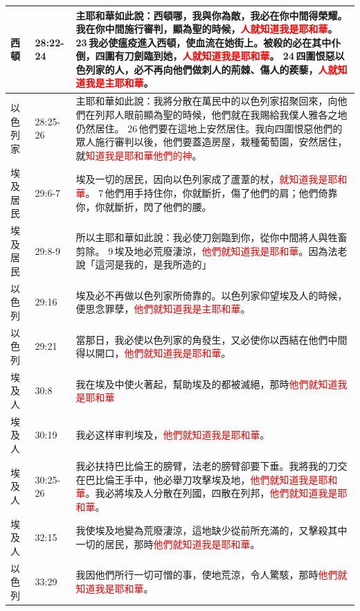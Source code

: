\begin{table}[H]
\begin{tabular}{p{1.5cm}|p{}|p{13.0cm}}
西頓&28:22-24&主耶和華如此說：西頓哪，我與你為敵，我必在你中間得榮耀。我在你中間施行審判，顯為聖的時候，\textcolor{red}{人就知道我是耶和華}。 23 我必使瘟疫進入西頓，使血流在她街上。被殺的必在其中仆倒，四圍有刀劍臨到她，\textcolor{red}{人就知道我是耶和華}。 24 四圍恨惡以色列家的人，必不再向他們做刺人的荊棘、傷人的蒺藜，\textcolor{red}{人就知道我是主耶和華}。\\\hline 


以色列家&28:25-26&主耶和華如此說：我將分散在萬民中的以色列家招聚回來，向他們在列邦人眼前顯為聖的時候，他們就在我賜給我僕人雅各之地仍然居住。 26 他們要在這地上安然居住。我向四圍恨惡他們的眾人施行審判以後，他們要蓋造房屋，栽種葡萄園，安然居住，就\textcolor{red}{知道我是耶和華他們的神}。\\\hline

埃及居民&29:6-7&埃及一切的居民，因向以色列家成了蘆葦的杖，\textcolor{red}{就知道我是耶和華}。 7 他們用手持住你，你就斷折，傷了他們的肩；他們倚靠你，你就斷折，閃了他們的腰。\\\hline

埃及居民&29:8-9&所以主耶和華如此說：我必使刀劍臨到你，從你中間將人與牲畜剪除。 9 埃及地必荒廢淒涼，\textcolor{red}{他們就知道我是耶和華}。因為法老說「這河是我的，是我所造的」\\\hline
以色列&29:16&埃及必不再做以色列家所倚靠的。以色列家仰望埃及人的時候，便思念罪孽，\textcolor{red}{他們就知道我是主耶和華}。\\\hline
以色列&29:21&當那日，我必使以色列家的角發生，又必使你以西結在他們中間得以開口，\textcolor{red}{他們就知道我是耶和華}。\\\hline

埃及人&30:8&我在埃及中使火著起，幫助埃及的都被滅絕，那時\textcolor{red}{他們就知道我是耶和華}\\\hline 

埃及人&30:19&我必这样审判埃及，\textcolor{red}{他們就知道我是耶和華}。\\\hline
埃及人&30:25-26&我必扶持巴比倫王的膀臂，法老的膀臂卻要下垂。我將我的刀交在巴比倫王手中，他必舉刀攻擊埃及地，\textcolor{red}{他們就知道我是耶和華}。我必將埃及人分散在列國，四散在列邦，\textcolor{red}{他們就知道我是耶和華}。\\\hline 
埃及人&32:15&我使埃及地變為荒廢淒涼，這地缺少從前所充滿的，又擊殺其中一切的居民，那時\textcolor{red}{他們就知道我是耶和華}。\\\hline

以色列&33:29&我因他們所行一切可憎的事，使地荒涼，令人驚駭，那時\textcolor{red}{他們就知道我是耶和華}。\\\hline
\end{tabular}
\end{table}


